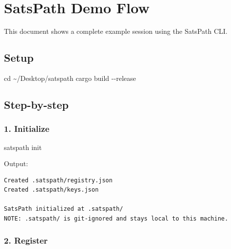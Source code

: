 \documentclass[
]{article}
\author{}
\date{}
\newenvironment{Shaded}{}{}
\newcommand{\AttributeTok}[1]{\textcolor[rgb]{0.49,0.56,0.16}{#1}}
\newcommand{\BuiltInTok}[1]{\textcolor[rgb]{0.00,0.50,0.00}{#1}}
\newcommand{\ExtensionTok}[1]{#1}
\newcommand{\NormalTok}[1]{#1}
\begin{document}
\hypertarget{satspath-demo-flow}{%
\section{SatsPath Demo Flow}\label{satspath-demo-flow}}

This document shows a complete example session using the SatsPath CLI.

\hypertarget{setup}{%
\subsection{Setup}\label{setup}}

\begin{Shaded}
\begin{Highlighting}[]
\BuiltInTok{cd}\NormalTok{ \textasciitilde{}/Desktop/satspath}
\ExtensionTok{cargo}\NormalTok{ build }\AttributeTok{{-}{-}release}
\end{Highlighting}
\end{Shaded}

\hypertarget{step-by-step}{%
\subsection{Step-by-step}\label{step-by-step}}

\hypertarget{initialize}{%
\subsubsection{1. Initialize}\label{initialize}}

\begin{Shaded}
\begin{Highlighting}[]
\ExtensionTok{satspath}\NormalTok{ init}
\end{Highlighting}
\end{Shaded}

Output:

\begin{verbatim}
Created .satspath/registry.json
Created .satspath/keys.json

SatsPath initialized at .satspath/
NOTE: .satspath/ is git-ignored and stays local to this machine.
\end{verbatim}

\hypertarget{register}{%
\subsubsection{2. Register}\label{register}}
\end{document}

